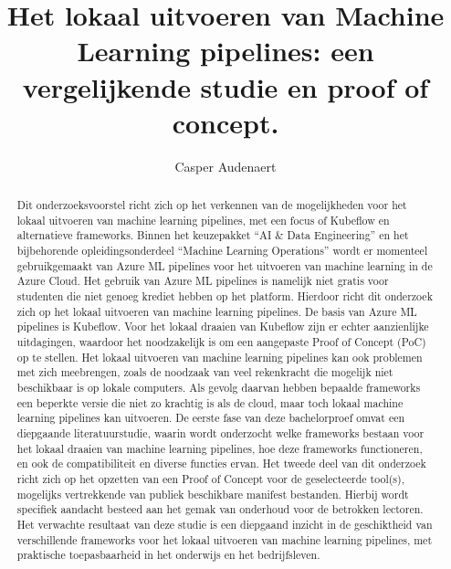 \documentclass{hogent-article}
\title{Het lokaal uitvoeren van Machine Learning pipelines: een vergelijkende studie en proof of concept.}
\author{Casper Audenaert}
\begin{document}
\begin{abstract}
  Dit onderzoeksvoorstel richt zich op het verkennen van de mogelijkheden voor het lokaal uitvoeren van machine learning pipelines, met een focus of Kubeflow en alternatieve frameworks.
  Binnen het keuzepakket ``AI \& Data Engineering'' en het bijbehorende opleidingsonderdeel ``Machine Learning Operations'' wordt er momenteel gebruikgemaakt van Azure ML pipelines voor het uitvoeren van machine learning in de Azure Cloud.
  Het gebruik van Azure ML pipelines is namelijk niet gratis voor studenten die niet genoeg krediet hebben op het platform. Hierdoor richt dit onderzoek zich op het lokaal uitvoeren van machine learning pipelines.
  De basis van Azure ML pipelines is Kubeflow. Voor het lokaal draaien van Kubeflow zijn er echter aanzienlijke uitdagingen, waardoor het noodzakelijk is om een aangepaste Proof of Concept (PoC) op te stellen.
  Het lokaal uitvoeren van machine learning pipelines kan ook problemen met zich meebrengen, zoals de noodzaak van veel rekenkracht die mogelijk niet beschikbaar is op lokale computers. Als gevolg daarvan hebben bepaalde frameworks een beperkte versie die niet zo krachtig is als de cloud, maar toch lokaal machine learning pipelines kan uitvoeren.
  De eerste fase van deze bachelorproef omvat een diepgaande literatuurstudie, waarin wordt onderzocht welke frameworks bestaan voor het lokaal draaien van machine learning pipelines, hoe deze frameworks functioneren, en ook de compatibiliteit en diverse functies ervan.
  Het tweede deel van dit onderzoek richt zich op het opzetten van een Proof of Concept voor de geselecteerde tool(s), mogelijks vertrekkende van publiek beschikbare manifest bestanden. Hierbij wordt specifiek aandacht besteed aan het gemak van onderhoud voor de betrokken lectoren.
  Het verwachte resultaat van deze studie is een diepgaand inzicht in de geschiktheid van verschillende frameworks voor het lokaal uitvoeren van machine learning pipelines, met praktische toepasbaarheid in het onderwijs en het bedrijfsleven.
\end{abstract}

\tableofcontents



\printbibliography[heading=bibintoc]
\end{document}
